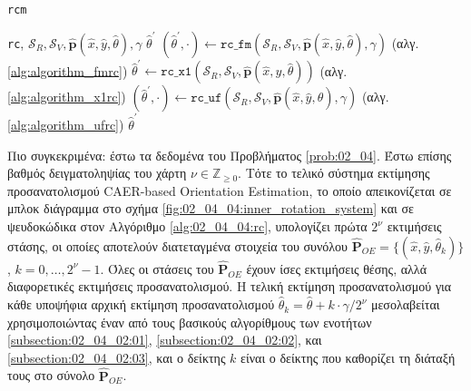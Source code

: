 \begin{algorithm}[!h]
  \caption{\texttt{rcm}}
  \begin{spacing}{1.5}
  \begin{algorithmic}[1]
    \REQUIRE \texttt{rc}, $\mathcal{S}_R, \mathcal{S}_V, \hat{\bm{p}}(\hat{x}, \hat{y}, \hat{\theta}), \gamma$
    \ENSURE $\hat{\theta}^\prime$
      \STATE $(\hat{\theta}^\prime, \cdot) \leftarrow \texttt{rc\_fm}(\mathcal{S}_R, \mathcal{S}_V, \hat{\bm{p}}(\hat{x}, \hat{y}, \hat{\theta}), \gamma)$ \hfill (αλγ. \ref{alg:algorithm_fmrc})
      \STATE $\hat{\theta}^\prime \leftarrow \texttt{rc\_x1}(\mathcal{S}_R, \mathcal{S}_V, \hat{\bm{p}}(\hat{x}, \hat{y}, \hat{\theta}))$ \hfill (αλγ. \ref{alg:algorithm_x1rc})
      \STATE $(\hat{\theta}^\prime, \cdot) \leftarrow \texttt{rc\_uf}(\mathcal{S}_R, \mathcal{S}_V, \hat{\bm{p}}(\hat{x}, \hat{y}, \hat{\theta}), \gamma)$ \hfill (αλγ. \ref{alg:algorithm_ufrc})
    \ENDIF
    \RETURN $\hat{\theta}^\prime$
  \end{algorithmic}
  \end{spacing}
  \label{alg:02_04_04:rcm}
\end{algorithm}


Πιο συγκεκριμένα: έστω τα δεδομένα του Προβλήματος \ref{prob:02_04}.  Έστω
επίσης βαθμός δειγματοληψίας του χάρτη $\nu \in \mathbb{Z}_{\geq 0}$. Τότε το
τελικό σύστημα εκτίμησης προσανατολισμού CAER-based Orientation Estimation, το
οποίο απεικονίζεται σε μπλοκ διάγραμμα στο σχήμα
\ref{fig:02_04_04:inner_rotation_system} και σε ψευδοκώδικα στον Αλγόριθμο
\ref{alg:02_04_04:rc}, υπολογίζει πρώτα $2^\nu$ εκτιμήσεις στάσης, οι οποίες
αποτελούν διατεταγμένα στοιχεία του συνόλου $\hat{\bm{P}}_{OE} = \{(\hat{x},
\hat{y}, \hat{\theta}_k)\}$, $k = 0,\dots,2^\nu-1$.  Όλες οι στάσεις του
$\hat{\bm{P}}_{OE}$ έχουν ίσες εκτιμήσεις θέσης, αλλά διαφορετικές εκτιμήσεις
προσανατολισμού. Η τελική εκτίμηση προσανατολισμού για κάθε υποψήφια αρχική
εκτίμηση προσανατολισμού $\hat{\theta}_k = \hat{\theta} + k \cdot \gamma
/2^\nu$ μεσολαβείται χρησιμοποιώντας έναν από τους βασικούς αλγορίθμους των
ενοτήτων \ref{subsection:02_04_02:01}, \ref{subsection:02_04_02:02}, και
\ref{subsection:02_04_02:03}, και ο δείκτης $k$ είναι ο δείκτης που καθορίζει
τη διάταξή τους στο σύνολο $\hat{\bm{P}}_{OE}$.

